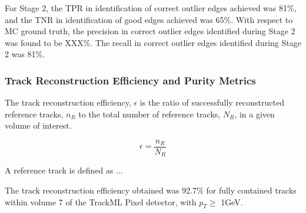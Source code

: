 For Stage 2, the TPR in identification of correct outlier edges achieved was 81\%, and the TNR in identification of good edges achieved was 65\%. With respect to MC ground truth, the precision in correct outlier edges identified during Stage 2 was found to be XXX\%. The recall in correct outlier edges identified during Stage 2 was 81\%.








\subsubsection{Track Reconstruction Efficiency and Purity Metrics}

The track reconstruction efficiency, $\epsilon$ is the ratio of successfully reconstructed reference tracks, $n_R$ to the total number of reference tracks, $N_R$, in a given volume of interest. 

\begin{equation}
    \epsilon = \frac{n_R}{N_R}
    \label{eqn:reoncstruction-eff}
\end{equation}

A reference track is defined as ...


The track reconstruction efficiency obtained was 92.7\% for fully contained tracks within volume 7 of the TrackML Pixel detector, with $p_{T} \geq$ 1GeV. 




